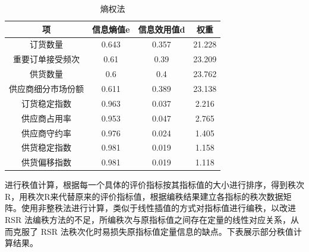 \documentclass[UTF8]{ctexart}
\begin{document}
\begin{table}[!ht]
	\centering
	\caption{熵权法}
	\begin{tabular}{|c|c|c|c|}
		\hline
		项                 & 信息熵值e & 信息效用值d & 权重   \\ \hline
		订货数量           & 0.643     & 0.357       & 21.228 \\ \hline
		重要订单接受频次   & 0.61      & 0.39        & 23.209 \\ \hline
		供货数量           & 0.6       & 0.4         & 23.762 \\ \hline
		供应商细分市场份额 & 0.611     & 0.389       & 23.138 \\ \hline
		订货稳定指数       & 0.963     & 0.037       & 2.216  \\ \hline
		供应商占用率       & 0.953     & 0.047       & 2.765  \\ \hline
		供应商守约率       & 0.976     & 0.024       & 1.405  \\ \hline
		供货稳定指数       & 0.981     & 0.019       & 1.158  \\ \hline
		供货偏移指数       & 0.981     & 0.019       & 1.118  \\ \hline
	\end{tabular}
\end{table}

进行秩值计算，根据每一个具体的评价指标按其指标值的大小进行排序，得到秩次R，用秩次R来代替原来的评价指标值，根据编秩结果建立各指标的秩次数据矩阵。使用非整秩法进行计算，类似于线性插值的方式对指标值进行编秩，以改进 RSR 法编秩方法的不足，所编秩次与原指标值之间存在定量的线性对应关系，从而克服了 RSR 法秩次化时易损失原指标值定量信息的缺点。下表展示部分秩值计算结果。
\end{document}
